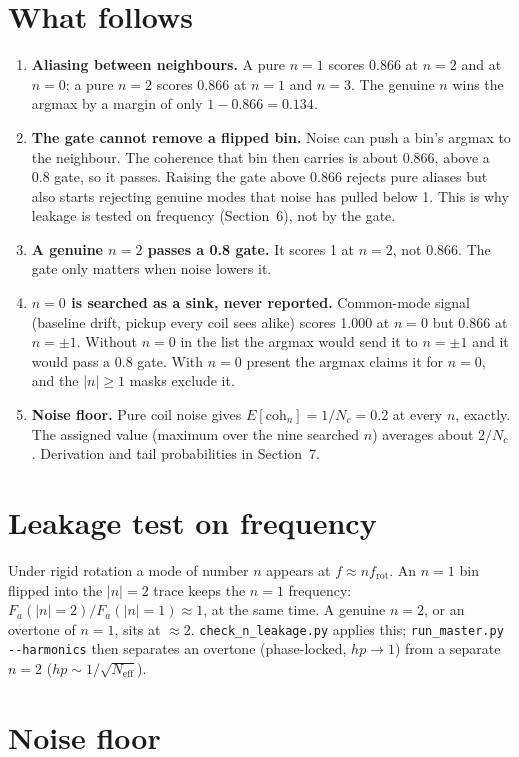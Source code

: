 \documentclass[11pt]{article}
\begin{document}
\section{What follows}
\begin{enumerate}
\item \textbf{Aliasing between neighbours.} A pure $n=1$ scores 0.866 at
  $n=2$ and at $n=0$; a pure $n=2$ scores 0.866 at $n=1$ and $n=3$. The
  genuine $n$ wins the argmax by a margin of only $1-0.866=0.134$.
\item \textbf{The gate cannot remove a flipped bin.} Noise can push a bin's
  argmax to the neighbour. The coherence that bin then carries is about
  0.866, above a 0.8 gate, so it passes. Raising the gate above 0.866 rejects
  pure aliases but also starts rejecting genuine modes that noise has pulled
  below 1. This is why leakage is tested on frequency (Section~6), not by
  the gate.
\item \textbf{A genuine $n=2$ passes a 0.8 gate.} It scores 1 at $n=2$, not
  0.866. The gate only matters when noise lowers it.
\item \textbf{$n=0$ is searched as a sink, never reported.} Common-mode
  signal (baseline drift, pickup every coil sees alike) scores 1.000 at $n=0$
  but 0.866 at $n=\pm1$. Without $n=0$ in the list the argmax would send it
  to $n=\pm1$ and it would pass a 0.8 gate. With $n=0$ present the argmax
  claims it for $n=0$, and the $|n|\ge1$ masks exclude it.
\item \textbf{Noise floor.} Pure coil noise gives $E[\mathrm{coh}_n]=1/N_c=0.2$
  at every $n$, exactly. The assigned value (maximum over the nine searched
  $n$) averages about $2/N_c$. Derivation and tail probabilities in
  Section~7.
\end{enumerate}

\section{Leakage test on frequency}
Under rigid rotation a mode of number $n$ appears at $f \approx n f_{\mathrm{rot}}$.
An $n=1$ bin flipped into the $|n|=2$ trace keeps the $n=1$ frequency:
$F_a(|n|{=}2)/F_a(|n|{=}1)\approx 1$, at the same time. A genuine $n=2$, or an
overtone of $n=1$, sits at $\approx 2$. \texttt{check\_n\_leakage.py} applies
this; \texttt{run\_master.py -{}-harmonics} then separates an overtone
(phase-locked, $hp\to1$) from a separate $n=2$ ($hp\sim 1/\sqrt{N_\mathrm{eff}}$).


\section{Noise floor}
\end{document}
